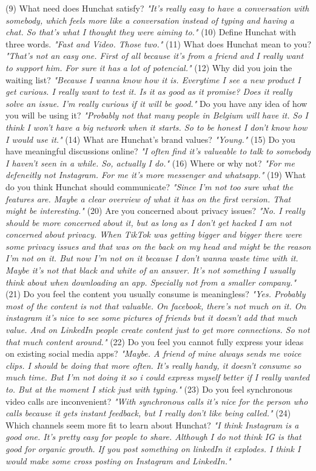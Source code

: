 \documentclass[12pt]{article}
\begin{document}
(9) What need does Hunchat satisfy? \textit{"It's really easy to have a conversation with somebody, which feels more like a conversation instead of typing and having a chat. So that's what I thought they were aiming to."}
(10) Define Hunchat with three words. \textit{"Fast and Video. Those two."}
(11) What does Hunchat mean to you? \textit{"That's not an easy one. First of all because it's from a friend and I really want to support him. For sure it has a lot of potencial."}
(12) Why did you join the waiting list? \textit{"Because I wanna know how it is. Everytime I see a new product I get curious. I really want to test it. Is it as good as it promise? Does it really solve an issue. I'm really curious if it will be good."}
Do you have any idea of how you will be using it?  \textit{"Probably not that many people in Belgium will have it. So I think I won't have a big network when it starts. So to be honest I don't know how I would use it."}
(14) What are Hunchat’s brand values? \textit{"Young."}
(15) Do you have meaningful discussions online? \textit{"I often find it's valueable to talk to somebody I haven't seen in a while. So, actually I do."}
(16) Where or why not? \textit{"For me defeneitly not Instagram. For me it's more messenger and whatsapp."}
(19) What do you think Hunchat should communicate? \textit{"Since I'm not too sure what the features are. Maybe a clear overview of what it has on the first version. That might be interesting."}
(20) Are you concerned about privacy issues? \textit{"No. I really should be more concerned about it, but as long as I don't get hacked I am not concerned about privacy. When TikTok was getting bigger and bigger there were some privacy issues and that was on the back on my head and might be the reason I'm not on it. But now I'm not on it because I don't wanna waste time with it. Maybe it's not that black and white of an answer. It's not something I usually think about when downloading an app. Specially not from a smaller company."}
(21) Do you feel the content you usually consume is meaningless? \textit{"Yes. Probably most of the content is not that valuable. On facebook, there's not much on it. On instagram it's nice to see some pictures of friends but it doesn't add that much value. And on LinkedIn people create content just to get more connections. So not that much content around."}
(22) Do you feel you cannot fully express your ideas on existing social media apps? \textit{"Maybe. A friend of mine always sends me voice clips. I should be doing that more often. It's really handy, it doesn't consume so much time. But I'm not doing it so i could express myself better if I really wanted to. But at the moment I stick just with typing."}
(23) Do you feel synchronous video calls are inconvenient? \textit{"With synchronous calls it's nice for the person who calls because it gets instant feedback, but I really don't like being called."}
(24) Which channels seem more fit to learn about Hunchat? \textit{"I think Instagram is a good one. It's pretty easy for people to share. Although I do not think IG is that good for organic growth. If you post something on linkedIn it explodes. I think I would make some cross posting on Instagram and LinkedIn."}
\end{document}
